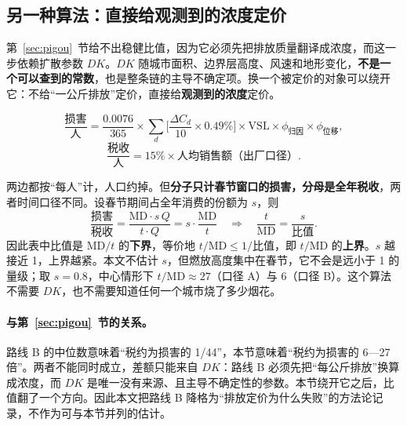 \subsection{另一种算法：直接给观测到的浓度定价}\label{sec:observed}

第~\ref{sec:pigou}~节给不出稳健比值，因为它必须先把排放质量翻译成浓度，而这一步依赖扩散参数 $DK$。$DK$ 随城市面积、边界层高度、风速和地形变化，\textbf{不是一个可以查到的常数}，也是整条链的主导不确定项。换一个被定价的对象可以绕开它：不给“一公斤排放”定价，直接给\textbf{观测到的浓度}定价。

\begin{equation}
\frac{\text{损害}}{\text{人}}=\frac{0.0076}{365}\times\sum_{d}\Big[\frac{\Delta C_d}{10}\times 0.49\%\Big]\times \mathrm{VSL}\times \phi_{\text{归因}}\times\phi_{\text{位移}},
\label{eq:observed}
\end{equation}
\begin{equation}
\frac{\text{税收}}{\text{人}}=15\%\times \text{人均销售额（出厂口径）}.
\label{eq:observed-tax}
\end{equation}

两边都按“每人”计，人口约掉。但\textbf{分子只计春节窗口的损害，分母是全年税收}，两者时间口径不同。设春节期间占全年消费的份额为 $s$，则
\[
\frac{\text{损害}}{\text{税收}}=\frac{\mathrm{MD}\cdot s\,Q}{t\cdot Q}=s\cdot\frac{\mathrm{MD}}{t}
\quad\Longrightarrow\quad
\frac{t}{\mathrm{MD}}=\frac{s}{\text{比值}}.
\]
因此表中比值是 $\mathrm{MD}/t$ 的\textbf{下界}，等价地 $t/\mathrm{MD}\le 1/\text{比值}$，即 $t/\mathrm{MD}$ 的\textbf{上界}。$s$ 越接近 1，上界越紧。本文不估计 $s$，但燃放高度集中在春节，它不会是远小于 1 的量级；取 $s=0.8$，中心情形下 $t/\mathrm{MD}\approx 27$（口径 A）与 $6$（口径 B）。这个算法不需要 $DK$，也不需要知道任何一个城市烧了多少烟花。

\paragraph{与第~\ref{sec:pigou}~节的关系。} 路线 B 的中位数意味着“税约为损害的 1/44”，本节意味着“税约为损害的 6—27 倍”。两者不能同时成立，差额只能来自 $DK$：路线 B 必须先把“每公斤排放”换算成浓度，而 $DK$ 是唯一没有来源、且主导不确定性的参数。本节绕开它之后，比值翻了一个方向。因此本文把路线 B 降格为“排放定价为什么失败”的方法论记录，不作为可与本节并列的估计。

